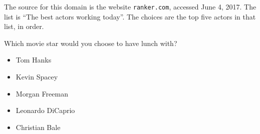 The source for this domain is the website \texttt{ranker.com}, accessed June 4, 2017.
The list is ``The best actors working today''.
The choices are the top five actors in that list, in order.

\begin{tcolorbox}
Which movie star would you choose to have lunch with?

\begin{itemize}
	\item Tom Hanks
	\item Kevin Spacey
	\item Morgan Freeman
	\item Leonardo DiCaprio
	\item Christian Bale
\end{itemize}
\end{tcolorbox}

